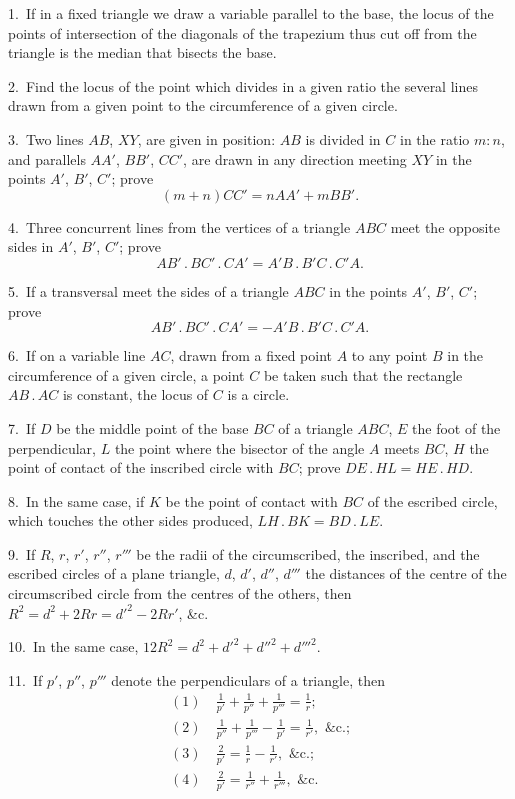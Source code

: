 \documentclass[oneside]{book}
\begin{document}
\begin{footnotesize}
1.~If in a fixed triangle we draw a variable parallel to the
base, the locus of the points of intersection of the diagonals of
the trapezium thus cut off from the triangle is the median that
bisects the base.

2.~Find the locus of the point which divides in a given ratio
the several lines drawn from a given point to the circumference
of a given circle.

3.~Two lines $AB$, $XY$, are given in position: $AB$ is divided in
$C$ in the ratio $m:n$, and parallels $AA'$, $BB'$, $CC'$, are drawn in
any direction meeting $XY$ in the points $A'$, $B'$, $C'$; prove
\[
   (m + n) CC' = n AA' + m BB'.
\]

4.~Three concurrent lines from the vertices of a triangle $ABC$
meet the opposite sides in $A'$, $B'$, $C'$; prove
\[
   AB'\,.\,BC'\,.\,CA' = A'B\,.\,B'C\,.\,C'A.
\]

5.~If a transversal meet the sides of a triangle $ABC$ in the
points $A'$, $B'$, $C'$; prove
\[
   AB'\,.\,BC'\,.\,CA' = - A'B\,.\,B'C\,.\,C'A.
\]

6.~If on a variable line $AC$, drawn from a fixed point $A$ to any
point $B$ in the circumference of a given circle, a point $C$ be taken
such that the rectangle $AB\,.\,AC$ is constant, the locus of $C$ is a
circle.

7.~If $D$ be the middle point of the base $BC$ of a triangle $ABC$,
$E$ the foot of the perpendicular, $L$ the point where the bisector of
the angle $A$ meets $BC$, $H$ the point of contact of the inscribed
circle with $BC$; prove $DE\,.\,HL = HE\,.\,HD$.

8.~In the same case, if $K$ be the point of contact with $BC$
of the escribed circle, which touches the other sides produced,
$LH\,.\,BK = BD\,.\,LE$.

9.~If $R$, $r$, $r'$, $r''$, $r'''$ be the radii of the circumscribed, the inscribed,
and the escribed circles of a plane triangle, $d$, $d'$, $d''$, $d'''$
the distances of the centre of the circumscribed circle from the
centres of the others, then $R^2 = d^2 + 2 R r = d'^2 - 2 R r'$, \&c.

10.~In the same case, $12 R^2 = d^2 + d'^2 + d''^2 + d'''^2$.

11.~If $p'$, $p''$, $p'''$ denote the perpendiculars of a triangle, then
\begin{align*}
  (1)\ &\frac{1}{p'} + \frac{1}{p''} + \frac{1}{p'''} = \frac{1}{r} ; \\
  (2)\ &\frac{1}{p''} + \frac{1}{p'''} - \frac{1}{p'} = \frac{1}{r'} , \text{\ \&c.;} \\
  (3)\ &\frac{2}{p'} = \frac{1}{r} - \frac{1}{r'} , \text{\ \&c.;} \\
  (4)\ &\frac{2}{p'} = \frac{1}{r''} + \frac{1}{r'''} , \text{\ \&c.}
\end{align*}


\end{footnotesize}
\end{document}
